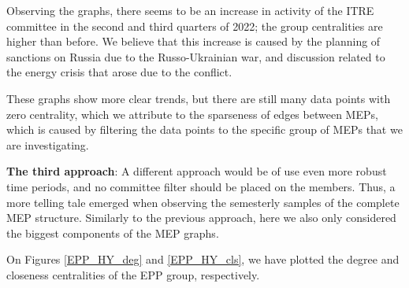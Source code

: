 \documentclass[lettersize,journal]{IEEEtran}
\begin{document}
Observing the graphs, there seems to be an increase in activity of the ITRE committee in the second and third quarters of 2022; the group centralities are higher than before. We believe that this increase is caused by the planning of sanctions on Russia due to the Russo-Ukrainian war, and discussion related to the energy crisis that arose due to the conflict.

These graphs show more clear trends, but there are still many data points with zero centrality, which we attribute to the sparseness of edges between MEPs, which is caused by filtering the data points to the specific group of MEPs that we are investigating. 

\textbf{The third approach}: A different approach would be of use even more robust time periods, and no committee filter should be placed on the members. Thus, a more telling tale emerged when observing the semesterly samples of the complete MEP structure. Similarly to the previous approach, here we also only considered the biggest components of the MEP graphs. 

On Figures \ref{EPP_HY_deg} and \ref{EPP_HY_cls}, we have plotted the degree and closeness centralities of the EPP group, respectively.
\end{document}

